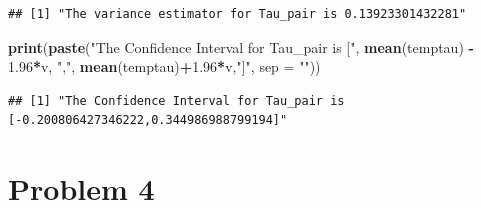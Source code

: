 \documentclass[]{article}
\newenvironment{Shaded}{\begin{snugshade}}{\end{snugshade}}
\newcommand{\KeywordTok}[1]{\textcolor[rgb]{0.13,0.29,0.53}{\textbf{#1}}}
\newcommand{\DataTypeTok}[1]{\textcolor[rgb]{0.13,0.29,0.53}{#1}}
\newcommand{\FloatTok}[1]{\textcolor[rgb]{0.00,0.00,0.81}{#1}}
\newcommand{\StringTok}[1]{\textcolor[rgb]{0.31,0.60,0.02}{#1}}
\newcommand{\OperatorTok}[1]{\textcolor[rgb]{0.81,0.36,0.00}{\textbf{#1}}}
\newcommand{\NormalTok}[1]{#1}
\begin{document}
\begin{verbatim}
## [1] "The variance estimator for Tau_pair is 0.13923301432281"
\end{verbatim}

\begin{Shaded}
\begin{Highlighting}[]
\KeywordTok{print}\NormalTok{(}\KeywordTok{paste}\NormalTok{(}\StringTok{"The Confidence Interval for Tau_pair is ["}\NormalTok{, }\KeywordTok{mean}\NormalTok{(temptau) }\OperatorTok{-}\StringTok{ }\FloatTok{1.96}\OperatorTok{*}\NormalTok{v, }\StringTok{","}\NormalTok{, }\KeywordTok{mean}\NormalTok{(temptau)}\OperatorTok{+}\FloatTok{1.96}\OperatorTok{*}\NormalTok{v,}\StringTok{"]"}\NormalTok{, }\DataTypeTok{sep =} \StringTok{""}\NormalTok{))}
\end{Highlighting}
\end{Shaded}

\begin{verbatim}
## [1] "The Confidence Interval for Tau_pair is [-0.200806427346222,0.344986988799194]"
\end{verbatim}

\section*{Problem 4}
\end{document}
